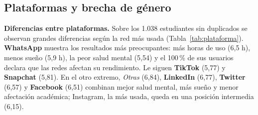 \documentclass[10pt,a4paper]{article}
\begin{document}
\subsection{Plataformas y brecha de género}

\textbf{Diferencias entre plataformas.} Sobre los 1.038 estudiantes sin duplicados se observan grandes
diferencias según la red más usada (Tabla~\ref{tab:plataforma}). \textbf{WhatsApp} muestra los resultados
más preocupantes: más horas de uso (6,5 h), menos sueño (5,9 h), la peor salud mental (5,54) y el
100\,\% de sus usuarios declara que las redes afectan su rendimiento. Le siguen \textbf{TikTok} (5,77) y
\textbf{Snapchat} (5,81). En el otro extremo, \emph{Otras} (6,84), \textbf{LinkedIn} (6,77),
\textbf{Twitter} (6,57) y \textbf{Facebook} (6,51) combinan mejor salud mental, más sueño y menor
afectación académica; Instagram, la más usada, queda en una posición intermedia (6,15).
\end{document}
